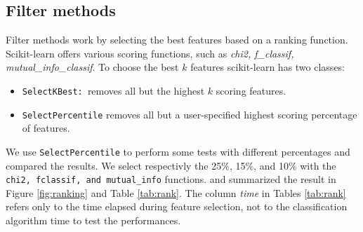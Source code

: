 \subsection{Filter methods}

Filter methods work by selecting the best features based on a ranking function. Scikit-learn offers various scoring functions, such as \textit{chi2, f\_classif, mutual\_info\_classif}. To choose the best $k$ features scikit-learn has two classes:
\begin{itemize}
	\item \texttt{SelectKBest: }removes all but the highest $k$ scoring features.
	\item \texttt{SelectPercentile} removes all but a user-specified highest scoring percentage of features.
\end{itemize} 
We use \texttt{SelectPercentile} to perform some tests with different percentages and compared the results. 
We select respectivly the 25\%, 15\%, and 10\% with the \texttt{chi2, fclassif, and mutual\_info} functions. and summarized the result in Figure \ref{fig:ranking} and Table \ref{tab:rank}. The column \textit{time} in Tables \ref{tab:rank} refers only to the time elapsed during feature selection, not to the classification algorithm time to test the performances.

